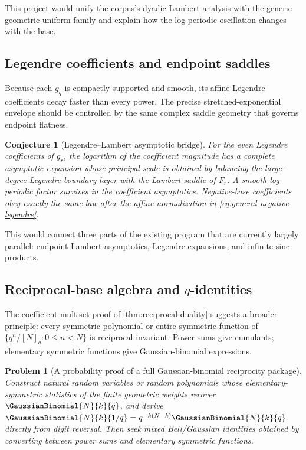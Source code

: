 \documentclass[11pt]{article}
\newtheorem{conjecture}[theorem]{Conjecture}
\newtheorem{problem}[theorem]{Problem}
\theoremstyle{definition}
\begin{document}
This project would unify the corpus's dyadic Lambert analysis with the generic
geometric-uniform family and explain how the log-periodic oscillation changes with the
base.

\subsection{Legendre coefficients and endpoint saddles}

Because each \(g_q\) is compactly supported and smooth, its affine Legendre coefficients
decay faster than every power.  The precise stretched-exponential envelope should be
controlled by the same complex saddle geometry that governs endpoint flatness.

\begin{conjecture}[Legendre--Lambert asymptotic bridge]\label{conj:legendre-lambert}
For the even Legendre coefficients of \(g_r\), the logarithm of the coefficient magnitude
has a complete asymptotic expansion whose principal scale is obtained by balancing the
large-degree Legendre boundary layer with the Lambert saddle of \(F_r\).  A smooth
log-periodic factor survives in the coefficient asymptotics.  Negative-base coefficients
obey exactly the same law after the affine normalization in
\cref{eq:general-negative-legendre}.
\end{conjecture}

This would connect three parts of the existing program that are currently largely
parallel: endpoint Lambert asymptotics, Legendre expansions, and infinite sinc products.

\subsection{Reciprocal-base algebra and $q$-identities}

The coefficient multiset proof of \cref{thm:reciprocal-duality} suggests a broader
principle: every symmetric polynomial or entire symmetric function of
\(\{q^n/[N]_q:0\le n<N\}\) is reciprocal-invariant.  Power sums give cumulants; elementary
symmetric functions give Gaussian-binomial expressions.

\begin{problem}[A probability proof of a full Gaussian-binomial reciprocity package]
Construct natural random variables or random polynomials whose elementary-symmetric
statistics of the finite geometric weights recover
\(\GaussianBinomial{N}{k}{q}\), and derive
\(\GaussianBinomial{N}{k}{1/q}=q^{-k(N-k)}\GaussianBinomial{N}{k}{q}\) directly from digit reversal.  Then seek
mixed Bell/Gaussian identities obtained by converting between power sums and elementary
symmetric functions.
\end{problem}
\end{document}
